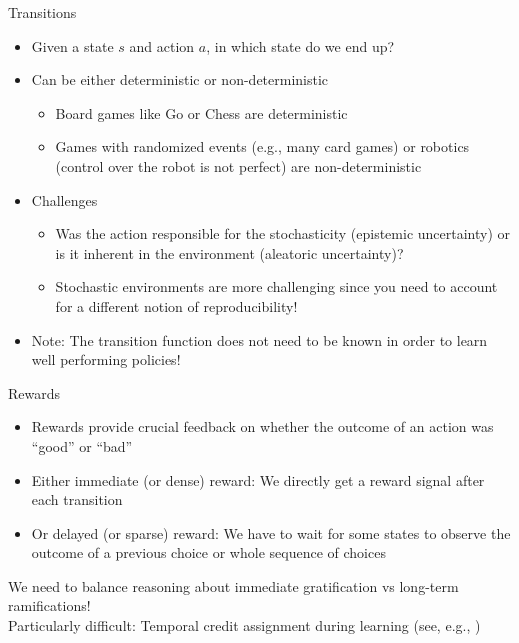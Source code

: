 \documentclass[main]{subfiles}
\begin{document}
\begin{frame}{Transitions}
    \begin{itemize}
        \item Given a state $s$ and action $a$, in which state do we end up?\pause
        \item Can be either deterministic or non-deterministic
        \begin{itemize}
            \item Board games like Go or Chess are deterministic
            \item Games with randomized events (e.g., many card games) or robotics (control over the robot is not perfect) are non-deterministic
        \end{itemize}\pause
        \item Challenges
        \begin{itemize}
            \item Was the action responsible for the stochasticity (epistemic uncertainty) or is it inherent in the environment (aleatoric uncertainty)?
            \item Stochastic environments are more challenging since you need to account for a different notion of reproducibility!
        \end{itemize}
        \item Note: The transition function does not need to be known in order to learn well performing policies!
    \end{itemize}
\end{frame}
\begin{frame}{Rewards}
    \begin{itemize}
        \item Rewards provide crucial feedback on whether the outcome of an action was ``good'' or ``bad''\pause
        \item Either immediate (or dense) reward: We directly get a reward signal after each transition\pause
        \item Or delayed (or sparse) reward: We have to wait for some states to observe the outcome of a previous choice or whole sequence of choices
    \end{itemize}\pause
    We need to balance reasoning about immediate gratification vs long-term ramifications!\\
    Particularly difficult: Temporal credit assignment during learning (see, e.g., )
\end{frame}
\end{document}
